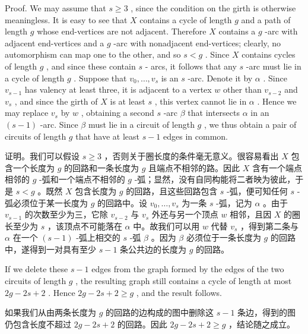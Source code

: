 \documentclass[10pt]{article}
\begin{document}
Proof. We may assume that \(s \geq  3\) , since the condition on the girth is otherwise meaningless. It is easy to see that \(X\) contains a cycle of length \(g\) and a path of length \(g\) whose end-vertices are not adjacent. Therefore \(X\) contains a \(g\) -arc with adjacent end-vertices and a \(g\) -arc with nonadjacent end-vertices; clearly, no automorphism can map one to the other, and so \(s < g\) . Since \(X\) contains cycles of length \(g\) , and since these contain \(s\) - arcs, it follows that any \(s\) -arc must lie in a cycle of length \(g\) . Suppose that \({v}_{0},\ldots ,{v}_{s}\) is an \(s\) -arc. Denote it by \(\alpha\) . Since \({v}_{s - 1}\) has valency at least three, it is adjacent to a vertex \(w\) other than \({v}_{s - 2}\) and \({v}_{s}\) , and since the girth of \(X\) is at least \(s\) , this vertex cannot lie in \(\alpha\) . Hence we may replace \({v}_{s}\) by \(w\) , obtaining a second \(s\) -arc \(\beta\) that intersects \(\alpha\) in an \(\left( {s - 1}\right)\) -arc. Since \(\beta\) must lie in a circuit of length \(g\) , we thus obtain a pair of circuits of length \(g\) that have at least \(s - 1\) edges in common.

\begin{tcolorbox}\relax
证明。我们可以假设 \(s \geq  3\) ，否则关于圈长度的条件毫无意义。很容易看出 \(X\) 包含一个长度为 \(g\) 的回路和一条长度为 \(g\) 且端点不相邻的路。因此 \(X\) 含有一个端点相邻的 \(g\) -弧和一个端点不相邻的 \(g\) -弧；显然，没有自同构能将二者映为彼此，于是 \(s < g\) 。既然 \(X\) 包含长度为 \(g\) 的回路，且这些回路包含 \(s\) -弧，便可知任何 \(s\) -弧必须位于某一长度为 \(g\) 的回路中。设 \({v}_{0},\ldots ,{v}_{s}\) 为一条 \(s\) -弧，记为 \(\alpha\) 。由于 \({v}_{s - 1}\) 的次数至少为三，它除 \({v}_{s - 2}\) 与 \({v}_{s}\) 外还与另一个顶点 \(w\) 相邻，且因 \(X\) 的圈长至少为 \(s\) ，该顶点不可能落在 \(\alpha\) 中。故我们可以用 \(w\) 代替 \({v}_{s}\) ，得到第二条与 \(\alpha\) 在一个 \(\left( {s - 1}\right)\) -弧上相交的 \(s\) -弧 \(\beta\) 。因为 \(\beta\) 必须位于一条长度为 \(g\) 的回路中，遂得到一对具有至少 \(s - 1\) 条公共边的长度为 \(g\) 的回路。
\end{tcolorbox}

If we delete these \(s - 1\) edges from the graph formed by the edges of the two circuits of length \(g\) , the resulting graph still contains a cycle of length at most \({2g} - {2s} + 2\) . Hence \({2g} - {2s} + 2 \geq  g\) , and the result follows.

\begin{tcolorbox}\relax
如果我们从由两条长度为 \(g\) 的回路的边构成的图中删除这 \(s - 1\) 条边，得到的图仍包含长度不超过 \({2g} - {2s} + 2\) 的回路。因此 \({2g} - {2s} + 2 \geq  g\) ，结论随之成立。
\end{tcolorbox}
\end{document}
